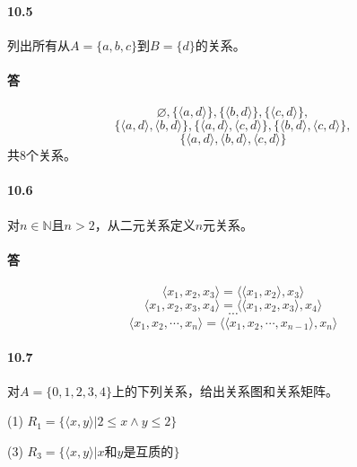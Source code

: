 \documentclass[UTF8]{ctexart}
\newcommand{\snatural}{\mathbb{N}}
\begin{document}
\paragraph{10.5}\label{10.5}
列出所有从$A=\{a,b,c\}$到$B=\{d\}$的关系。

\paragraph{答}
$$\varnothing,  \{ \langle a,d \rangle \} , \{ \langle b,d \rangle \} , \{ \langle c,d \rangle \},$$
$$ \{ \langle a,d \rangle , \langle b,d \rangle \} , \{ \langle a,d \rangle , \langle c,d \rangle \} , \{ \langle b,d \rangle , \langle c,d \rangle \}, $$
$$ \{ \langle a,d \rangle , \langle b,d \rangle , \langle c,d \rangle \} $$
共8个关系。

\paragraph{10.6}\label{10.6}
对$n \in \snatural$且$n >2$，从二元关系定义$n$元关系。
\paragraph{答}
$$ \langle x_1, x_2, x_3 \rangle = \langle \langle x_1, x_2 \rangle , x_3 \rangle $$
$$ \langle x_1, x_2, x_3, x_4 \rangle = \langle \langle x_1, x_2, x_3 \rangle , x_4 \rangle $$
$$ \cdots $$
$$ \langle x_1, x_2, \cdots, x_n \rangle = \langle \langle x_1, x_2, \cdots, x_ { n-1 } \rangle , x_n \rangle $$

\paragraph{10.7}\label{10.7}
对$A=\{0,1,2,3,4\}$上的下列关系，给出关系图和关系矩阵。

(1) $R_1 =  \{ \langle x,y \rangle |2 \le x \land y \le 2 \} $

(3) $R_3 = \{ \langle x,y \rangle | x\text{和}y\text{是互质的} \}$
\end{document}
